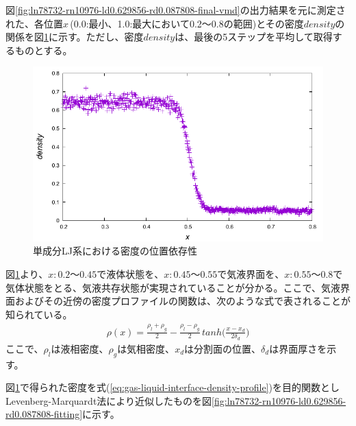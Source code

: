 \documentclass[titlepage]{jsreport}
\begin{document}
図\ref{fig:ln78732-rn10976-ld0.629856-rd0.087808-final-vmd}の出力結果を元に測定された、各位置$x$\,(0.0:最小、1.0:最大において0.2〜0.8の範囲)とその密度$density$の関係を図\ref{fig:ln78732-rn10976-ld0.629856-rd0.087808}に示す。ただし、密度$density$は、最後の5ステップを平均して取得するものとする。

\begin{figure}[htbp]
    \begin{center}
        \includegraphics[width=14cm]{fig/ln78732-rn10976-ld0.629856-rd0.087808/ln78732-rn10976-ld0.629856-rd0.087808.pdf}
    \end{center}
    \caption{単成分LJ系における密度の位置依存性}
    \label{fig:ln78732-rn10976-ld0.629856-rd0.087808}
\end{figure}

図\ref{fig:ln78732-rn10976-ld0.629856-rd0.087808}より、$x:0.2〜0.45$で液体状態を、$x:0.45〜0.55$で気液界面を、$x:0.55〜0.8$で気体状態をとる、気液共存状態が実現されていることが分かる。ここで、気液界面およびその近傍の密度プロファイルの関数は、次のような式で表されることが知られている\cite{gas-liquid-interface-density-profile}。
\large
\begin{eqnarray}
    \rho(x) = \frac{\rho_l+\rho_g}{2} - \frac{\rho_l-\rho_g}{2}\,tanh\Bigg(\frac{x-x_d}{2\delta_d}\Bigg) \label{eq:gas-liquid-interface-density-profile}
\end{eqnarray}
\normalsize
ここで、$\rho_l$は液相密度、$\rho_g$は気相密度、$x_d$は分割面の位置、$\delta_d$は界面厚さを示す。

図\ref{fig:ln78732-rn10976-ld0.629856-rd0.087808}で得られた密度を式(\ref{eq:gas-liquid-interface-density-profile})を目的関数としLevenberg-Marquardt法により近似したものを図\ref{fig:ln78732-rn10976-ld0.629856-rd0.087808-fitting}に示す。
\end{document}
